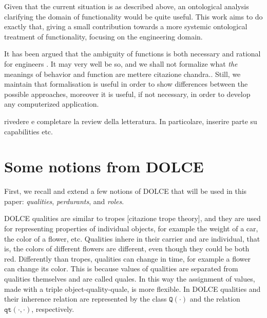 \documentclass[sw]{iosart2x}
\newcommand{\generalStyle}[1]{\texttt{#1}}
\newcommand{\biRel}[3]{\generalStyle{#1}(#2,#3)}
\newcommand{\uniRel}[2]{\generalStyle{#1}(#2)}
\newcommand{\DOLCE}{\textsc{DOLCE}\xspace} %
\newcommand{\DOLCEQuality}[1]{\uniRel{Q}{#1}}
\newcommand{\DOLCEQualityDirect}[2]{\biRel{qt}{#1}{#2}}
\newcommand{\firstTimeKeyWord}[1]{\textit{#1}}
\newcommand{\TODO}[1]{{\color{red} #1}}
\newcommand{\TODOinline}[1]{{\color{red} #1}}
\begin{document}
Given that the current situation is as described above, an ontological analysis clarifying the domain of functionality would be quite useful.
This work aims to do exactly that, giving a small contribution towards a more systemic ontological treatment of functionality, focusing on the engineering domain.

It has been argued that the ambiguity of functions is both necessary and rational for engineers \cite{vermaasConceptualElusivenessEngineering2012}.
It may very well be so, and we shall not formalize what \emph{the} meanings of behavior and function are \TODO{mettere citazione chandra.}.
Still, we maintain that formalisation is useful in order to show differences between the possible approaches, moreover it is useful, if not necessary, in order to develop any computerized application.


\TODO{rivedere e completare la review della letteratura. In particolare, inserire parte su capabilities etc.}




\section{Some notions from \DOLCE\label{sec:DOLCE}} 
First, we recall and extend a few notions of \DOLCE that will be used in this paper: \firstTimeKeyWord{qualities}, \firstTimeKeyWord{perdurants}, and \firstTimeKeyWord{roles}. 

\DOLCE qualities are similar to tropes \TODO{ [citazione trope theory]}, and they are used for representing properties of individual objects, for example the weight of a car, the color of a flower, etc.
Qualities inhere in their carrier and are individual, that is, the colors of different flowers are different, even though they could be both red.
Differently than tropes, qualities can change in time, for example a flower can change its color.
This is because values of qualities are separated from qualities themselves and are called quales. 
In this way the assignment of values, made with a triple object-quality-quale, is more flexible. 
In \DOLCE qualities and their inherence relation are represented by the class $\DOLCEQuality{\cdot}$ and the relation $\DOLCEQualityDirect{\cdot}{\cdot}$, respectively.
\end{document}
